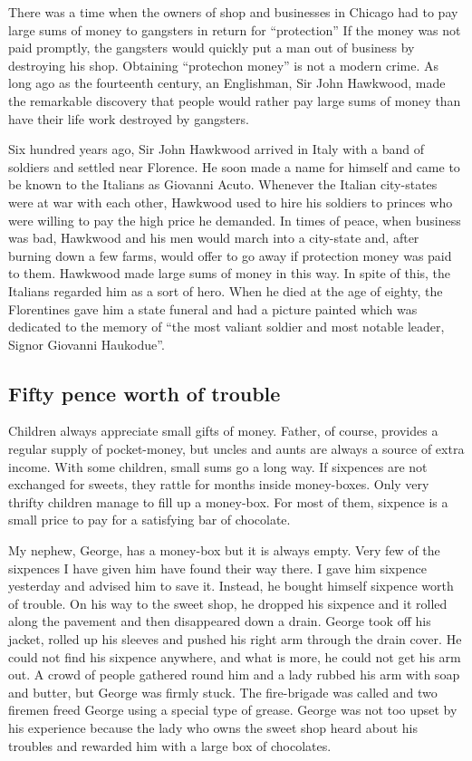 \documentclass[11pt]{article}
\begin{document}
There was a time when the owners of shop and businesses in Chicago had to pay large sums of money to gangsters in return for ``protection'' If the money was not paid promptly, the gangsters would quickly put a man out of business by destroying his shop. Obtaining ``protechon money'' is not a modern crime. As long ago as the fourteenth century, an Englishman, Sir John Hawkwood, made the remarkable discovery that people would rather pay large sums of money than have their life work destroyed by gangsters.

Six hundred years ago, Sir John Hawkwood arrived in Italy with a band of soldiers and settled near Florence. He soon made a name for himself and came to be known to the Italians as Giovanni Acuto. Whenever the Italian city-states were at war with each other, Hawkwood used to hire his soldiers to princes who were willing to pay the high price he demanded. In times of peace, when business was bad, Hawkwood and his men would march into a city-state and, after burning down a few farms, would offer to go away if protection money was paid to them. Hawkwood made large sums of money in this way. In spite of this, the Italians regarded him as a sort of hero. When he died at the age of eighty, the Florentines gave him a state funeral and had a picture painted which was dedicated to the memory of ``the most valiant soldier and most notable leader, Signor Giovanni Haukodue''. 
\subsection{Fifty pence worth of trouble}
\label{sec-1-15}

Children always appreciate small gifts of money. Father, of course, provides a regular supply of pocket-money, but uncles and aunts are always a source of extra income. With some children, small sums go a long way. If sixpences are not exchanged for sweets, they rattle for months inside money-boxes. Only very thrifty children manage to fill up a money-box. For most of them, sixpence is a small price to pay for a satisfying bar of chocolate.

My nephew, George, has a money-box but it is always empty. Very few of the sixpences I have given him have found their way there. I gave him sixpence yesterday and advised him to save it. Instead, he bought himself sixpence worth of trouble. On his way to the sweet shop, he dropped his sixpence and it rolled along the pavement and then disappeared down a drain. George took off his jacket, rolled up his sleeves and pushed his right arm through the drain cover. He could not find his sixpence anywhere, and what is more, he could not get his arm out. A crowd of people gathered round him and a lady rubbed his arm with soap and butter, but George was firmly stuck. The fire-brigade was called and two firemen freed George using a special type of grease. George was not too upset by his experience because the lady who owns the sweet shop heard about his troubles and rewarded him with a large box of chocolates. 
\end{document}
